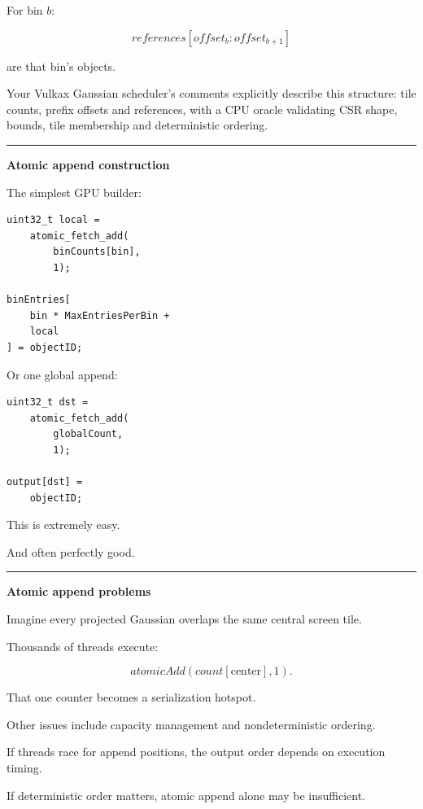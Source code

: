 For bin \(b\):

\[
references[
offset_b
:
offset_{b+1}
]
\]

are that bin's objects.

Your Vulkax Gaussian scheduler's comments explicitly describe this structure: tile counts, prefix offsets and references, with a CPU oracle validating CSR shape, bounds, tile membership and deterministic ordering.

\begin{center}\rule{0.5\linewidth}{0.5pt}\end{center}

\textbf{Atomic append construction}

The simplest GPU builder:

\protect{}\label{p10-atomic-bin}%
\begin{verbatim}
uint32_t local =
    atomic_fetch_add(
        binCounts[bin],
        1);

binEntries[
    bin * MaxEntriesPerBin +
    local
] = objectID;
\end{verbatim}

Or one global append:

\protect{}\label{p10-global-append}%
\begin{verbatim}
uint32_t dst =
    atomic_fetch_add(
        globalCount,
        1);

output[dst] =
    objectID;
\end{verbatim}

This is extremely easy.

And often perfectly good.

\begin{center}\rule{0.5\linewidth}{0.5pt}\end{center}

\textbf{Atomic append problems}

Imagine every projected Gaussian overlaps the same central screen tile.

Thousands of threads execute:

\[
atomicAdd(
count[\text{center}],
1
).
\]

That one counter becomes a serialization hotspot.

Other issues include capacity management and nondeterministic ordering.

If threads race for append positions, the output order depends on execution timing.

If deterministic order matters, atomic append alone may be insufficient.

